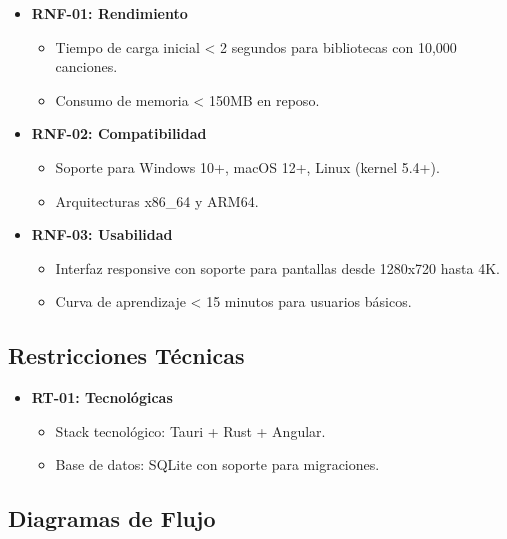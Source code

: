 \documentclass[11pt, a4paper]{article}
\begin{document}
  \begin{itemize}
  \item \textbf{RNF-01: Rendimiento}
    \begin{itemize}
      \item Tiempo de carga inicial < 2 segundos para bibliotecas con 10,000 canciones.
      \item Consumo de memoria < 150MB en reposo.
    \end{itemize}

  \item \textbf{RNF-02: Compatibilidad}
    \begin{itemize}
      \item Soporte para Windows 10+, macOS 12+, Linux (kernel 5.4+).
      \item Arquitecturas x86\_64 y ARM64.
    \end{itemize}

  \item \textbf{RNF-03: Usabilidad}
    \begin{itemize}
      \item Interfaz responsive con soporte para pantallas desde 1280x720 hasta 4K.
      \item Curva de aprendizaje < 15 minutos para usuarios básicos.
    \end{itemize}
  \end{itemize}

  \subsection{Restricciones Técnicas}

  \begin{itemize}
    \item \textbf{RT-01: Tecnológicas}
    \begin{itemize}
      \item Stack tecnológico: Tauri + Rust + Angular.
      \item Base de datos: SQLite con soporte para migraciones.
    \end{itemize}
  \end{itemize}

  \subsection{Diagramas de Flujo}
\end{document}
